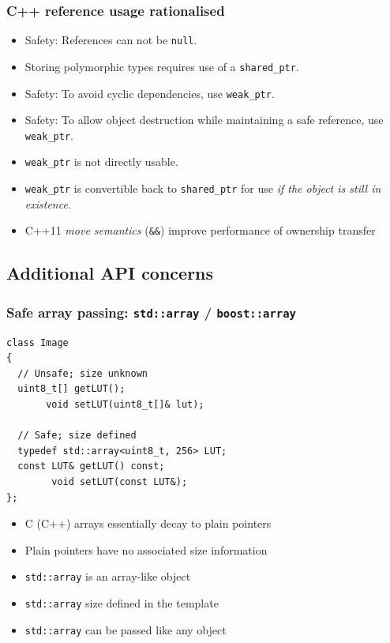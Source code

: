 \documentclass{beamer}
\begin{document}
\begin{frame}[fragile]
  \frametitle{C++ reference usage rationalised}
  \begin{itemize}
  \item<1-> Safety: References can not be \texttt{null}.
  \item<2-> Storing polymorphic types requires use of a
    \texttt{shared\_ptr}.
  \item<3-> Safety: To avoid cyclic dependencies, use \texttt{weak\_ptr}.
  \item<4-> Safety: To allow object destruction while maintaining a safe
    reference, use \texttt{weak\_ptr}.
  \item<5-> \texttt{weak\_ptr} is not directly usable.
  \item<5-> \texttt{weak\_ptr} is convertible back to \texttt{shared\_ptr}
    for use \emph{if the object is still in existence}.
  \item<6-> C++11 \emph{move semantics} (\texttt{\&\&}) improve
    performance of ownership transfer
  \end{itemize}
\end{frame}

\subsection{Additional API concerns}

\begin{frame}[fragile]
  \frametitle{Safe array passing: \texttt{std::array} / \texttt{boost::array}}
  \begin{lstlisting}
class Image
{
  // Unsafe; size unknown
  uint8_t[] getLUT();
       void setLUT(uint8_t[]& lut);

  // Safe; size defined
  typedef std::array<uint8_t, 256> LUT;
  const LUT& getLUT() const;
        void setLUT(const LUT&);
};
\end{lstlisting}
  \begin{itemize}
  \item<1-> C (C++) arrays essentially decay to plain pointers
  \item<2-> Plain pointers have no associated size information
  \item<3-> \texttt{std::array} is an array-like object
  \item<4-> \texttt{std::array} size defined in the template
  \item<5-> \texttt{std::array} can be passed like any object
  \end{itemize}
\end{frame}
\end{document}
